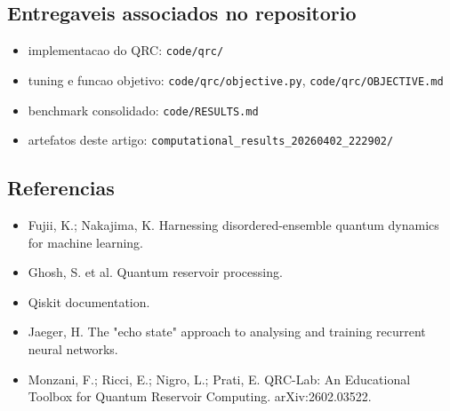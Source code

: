 \documentclass[12pt]{article}
\providecommand{\tightlist}{%
          \setlength{\itemsep}{0pt}\setlength{\parskip}{0pt}}
\begin{document}
\subsection{Entregaveis associados no repositorio}\label{entregaveis-associados-no-repositorio}

\begin{itemize}
\tightlist
\item
  implementacao do QRC: \texttt{code/qrc/}
\item
  tuning e funcao objetivo: \texttt{code/qrc/objective.py}, \texttt{code/qrc/OBJECTIVE.md}
\item
  benchmark consolidado: \texttt{code/RESULTS.md}
\item
  artefatos deste artigo: \texttt{computational\_results\_20260402\_222902/}
\end{itemize}

\subsection{Referencias}\label{referencias}

\begin{itemize}
\tightlist
\item
  Fujii, K.; Nakajima, K. Harnessing disordered-ensemble quantum dynamics for machine learning.
\item
  Ghosh, S. et al. Quantum reservoir processing.
\item
  Qiskit documentation.
\item
  Jaeger, H. The "echo state" approach to analysing and training recurrent neural networks.
\item
  Monzani, F.; Ricci, E.; Nigro, L.; Prati, E. QRC-Lab: An Educational Toolbox for Quantum Reservoir Computing. arXiv:2602.03522.
\end{itemize}

        
\end{document}
